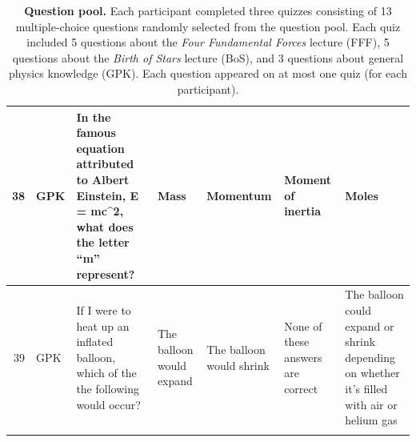 \documentclass[10pt]{article}
\begin{document}
\begin{tiny}
\begin{longtable}{|r|p{0.375in}|p{1.275in}|p{0.75in}|p{0.75in}|p{0.75in}|p{0.75in}|}
    38    &      GPK &                                                                                                                                                                              In the famous equation attributed to Albert Einstein, E = mc\textasciicircum 2, what does the letter ``m'' represent? &                                                                                                                                  Mass &                                                                                              Momentum &                                                                                                          Moment of inertia &                                                                                                                             Moles \\\hline
    39    &      GPK &                                                                                                                                                                                                If I were to heat up an inflated balloon, which of the the following would occur? &                                                                                                              The balloon would expand &                                                                              The balloon would shrink &                                                                                          None of these answers are correct &                                        The balloon could expand or shrink depending on whether it's filled with air or helium gas \\\hline

    \caption{\textbf{Question pool.} Each participant completed three quizzes consisting 
    of 13 multiple-choice questions randomly selected from the question pool. Each 
    quiz included 5 questions about the \textit{Four Fundamental Forces} lecture 
    (FFF), 5 questions about the \textit{Birth of Stars} lecture (BoS), and 3 questions 
    about general physics knowledge (GPK). Each question appeared on at most 
    one quiz (for each participant).}

    \label{tab:questions}
    \end{longtable}
\end{tiny}
\end{document}

